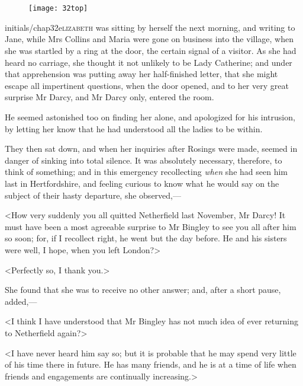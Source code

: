 \chapter[Chapter \thechapter]{}
	
\begin{figure}[t!]
\centering
\texttt{[image: 32top]}
\end{figure}


\lettrine[lines=6,image=true]{initials/chap32e}{lizabeth} was sitting by herself the next morning, and writing to Jane, while Mrs Collins and Maria were gone on business into the village, when she was startled by a ring at the door, the certain signal of a visitor. As she had heard no carriage, she thought it not unlikely to be Lady Catherine; and under that apprehension was putting away her half-finished letter, that she might escape all impertinent questions, when the door opened, and to her very great surprise Mr Darcy, and Mr Darcy only, entered the room.

He seemed astonished too on finding her alone, and apologized for his intrusion, by letting her know that he had understood all the ladies to be within.

They then sat down, and when her inquiries after Rosings were made, seemed in danger of sinking into total silence. It was absolutely necessary, therefore, to think of something; and in this emergency recollecting \textit{when} she had seen him last in Hertfordshire, and feeling curious to know what he would say on the subject of their hasty departure, she observed,—

<How very suddenly you all quitted Netherfield last November, Mr Darcy! It must have been a most agreeable surprise to Mr Bingley to see you all after him so soon; for, if I recollect right, he went but the day before. He and his sisters were well, I hope, when you left London?>

<Perfectly so, I thank you.>

She found that she was to receive no other answer; and, after a short pause, added,—

<I think I have understood that Mr Bingley has not much idea of ever returning to Netherfield again?>

<I have never heard him say so; but it is probable that he may spend very little of his time there in future. He has many friends, and he is at a time of life when friends and engagements are continually increasing.>

